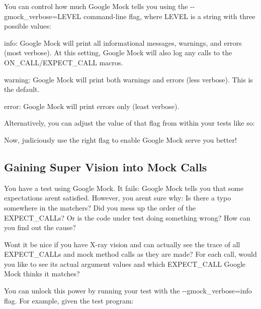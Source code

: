 You can control how much Google Mock tells you using the {\ttfamily -\/-\/gmock\+\_\+verbose=L\+E\+V\+EL} command-\/line flag, where {\ttfamily L\+E\+V\+EL} is a string with three possible values\+:


\begin{DoxyItemize}
\item {\ttfamily info}\+: Google Mock will print all informational messages, warnings, and errors (most verbose). At this setting, Google Mock will also log any calls to the {\ttfamily O\+N\+\_\+\+C\+A\+L\+L/\+E\+X\+P\+E\+C\+T\+\_\+\+C\+A\+LL} macros.
\item {\ttfamily warning}\+: Google Mock will print both warnings and errors (less verbose). This is the default.
\item {\ttfamily error}\+: Google Mock will print errors only (least verbose).
\end{DoxyItemize}

Alternatively, you can adjust the value of that flag from within your tests like so\+:


\begin{DoxyCode}{0}
\end{DoxyCode}


Now, judiciously use the right flag to enable Google Mock serve you better!

\subsection*{Gaining Super Vision into Mock Calls}

You have a test using Google Mock. It fails\+: Google Mock tells you that some expectations aren\textquotesingle{}t satisfied. However, you aren\textquotesingle{}t sure why\+: Is there a typo somewhere in the matchers? Did you mess up the order of the {\ttfamily E\+X\+P\+E\+C\+T\+\_\+\+C\+A\+LL}s? Or is the code under test doing something wrong? How can you find out the cause?

Won\textquotesingle{}t it be nice if you have X-\/ray vision and can actually see the trace of all {\ttfamily E\+X\+P\+E\+C\+T\+\_\+\+C\+A\+LL}s and mock method calls as they are made? For each call, would you like to see its actual argument values and which {\ttfamily E\+X\+P\+E\+C\+T\+\_\+\+C\+A\+LL} Google Mock thinks it matches?

You can unlock this power by running your test with the {\ttfamily -\/-\/gmock\+\_\+verbose=info} flag. For example, given the test program\+:


